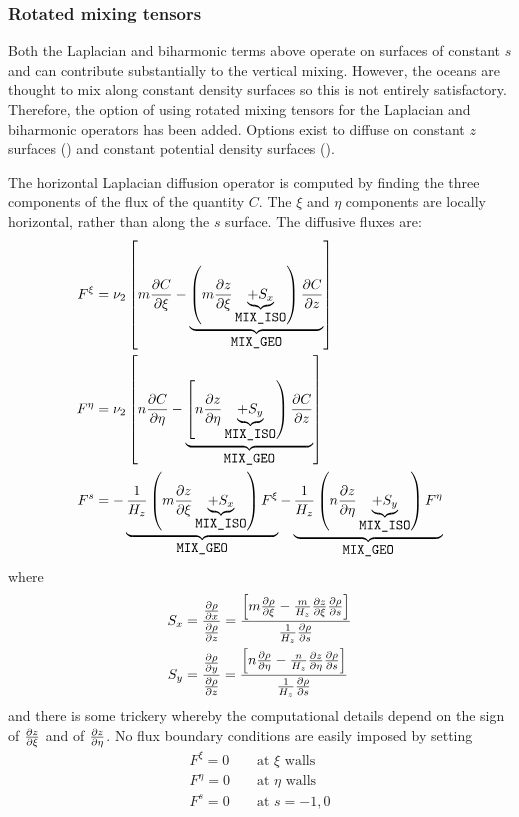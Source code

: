\subsubsection{Rotated mixing tensors}
Both the Laplacian and biharmonic terms above operate on surfaces of
constant $s$ and can contribute substantially to the vertical mixing.
However, the oceans are thought to mix along constant density surfaces so
this is not entirely satisfactory. Therefore, the option of using rotated
mixing tensors for the Laplacian and biharmonic operators has been added.
Options exist to diffuse on constant $z$ surfaces ()
and constant potential density surfaces ().

The horizontal Laplacian diffusion operator is computed by finding the
three components of the flux of the quantity $C$.  The $\xi$ and
$\eta$ components are locally horizontal, rather than along the
$s$ surface. The diffusive fluxes are:
\begin{align}
   F^\xi & = \nu_2 \left[ m
   {\partial C \over \partial \xi} -
   \underbrace{ \left( m {\partial z \over \partial \xi}
   \underbrace{+ S_x }_{\mbox{\tt MIX\_ISO}} \right)
   {\partial C \over \partial z} }_{\mbox{\tt MIX\_GEO}} \right]
\label{fluxx}
\\
   F^\eta & = \nu_2 \left[ n
   {\partial C \over \partial \eta} -
   \underbrace{ \left[ n {\partial z \over \partial \eta}
   \underbrace{+ S_y }_{\mbox{\tt MIX\_ISO}} \right)
   {\partial C \over \partial z} }_{\mbox{\tt MIX\_GEO}} \right]
\label{fluxy}
\\
   F^s & =
   - \underbrace{ {1 \over H_z} \left( m
   {\partial z \over \partial \xi}
   \underbrace{+ S_x }_{\mbox{\tt MIX\_ISO}} \right)
   F^\xi }_{\mbox{\tt MIX\_GEO}}
   - \underbrace{ {1 \over H_z} \left( n
   {\partial z \over \partial \eta}
   \underbrace{+ S_y }_{\mbox{\tt MIX\_ISO}} \right)
   F^\eta }_{\mbox{\tt MIX\_GEO}}
\label{fluxs}
\end{align}
where
\begin{align*}
  S_x & = { { \partial \rho \over \partial x} \over
    { \partial \rho \over \partial z} } =
    { \left[ m {\partial \rho \over \partial \xi} -
    {m \over H_z} {\partial z \over \partial \xi}
    { \partial \rho \over \partial s} \right] \over
    {1 \over H_z} {\partial \rho \over \partial s} }
\\
  S_y & = { { \partial \rho \over \partial y} \over
    { \partial \rho \over \partial z} } =
    { \left[ n {\partial \rho \over \partial \eta} -
    {n \over H_z} {\partial z \over \partial \eta}
    { \partial \rho \over \partial s} \right] \over
    {1 \over H_z} {\partial \rho \over \partial s} }
\end{align*}
and there is some trickery whereby the computational details depend on the sign
of $\partial z \over \partial \xi$ and of $\partial z \over \partial
\eta$.  No flux boundary conditions are easily imposed by setting
\begin{eqnarray*}
  F^\xi = 0    && \mbox{ at $\xi$ walls} \\
  F^\eta = 0   && \mbox{ at $\eta$ walls} \\
  F^s = 0 && \mbox{ at $s = -1,0$}
\end{eqnarray*}

